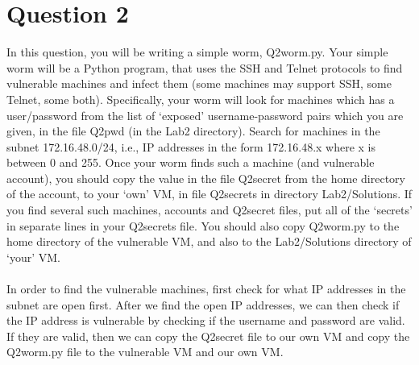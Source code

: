\documentclass{article}
\begin{document}
\section*{Question 2}
In this question, you will be writing a simple worm, Q2worm.py. 
Your simple worm will be a Python program, that uses the SSH and 
Telnet protocols to find vulnerable machines and infect them 
(some machines may support SSH, some Telnet, some both). 
Specifically, your worm will look for machines which has a 
user/password from the list of `exposed’ username-password pairs 
which you are given, in the file Q2pwd (in the Lab2 directory). 
Search for machines in the subnet 172.16.48.0/24, i.e., IP 
addresses in the form 172.16.48.x where x is between 0 and 255. 
Once your worm finds such a machine (and vulnerable account), 
you should copy the value in the  file Q2secret from the home 
directory of the account, to your `own’ VM, in file Q2secrets in 
directory Lab2/Solutions. If you find several such machines, 
accounts and Q2secret files, put all of the `secrets’ in separate 
lines in your Q2secrets file. You should also copy Q2worm.py to 
the home directory of the vulnerable VM, and also to the Lab2/Solutions 
directory of `your’ VM.
\\\\
In order to find the vulnerable machines, first check for what 
IP addresses in the subnet are open first. After we find the
open IP addresses, we can then check if the IP address is vulnerable
by checking if the username and password are valid. If they are
valid, then we can copy the Q2secret file to our own VM and copy
the Q2worm.py file to the vulnerable VM and our own VM.
\end{document}
